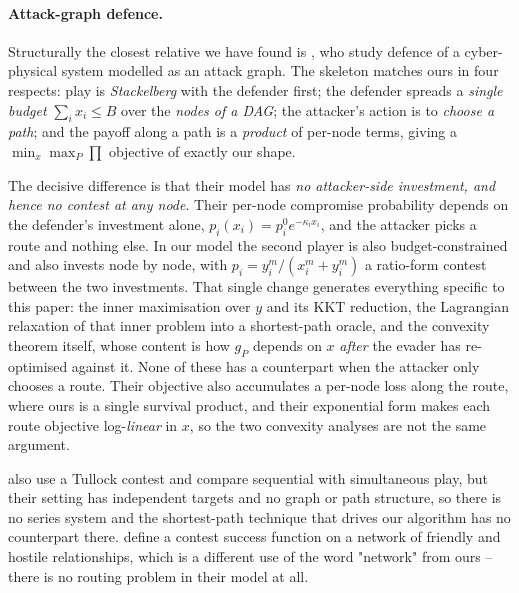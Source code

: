 \documentclass[11pt,a4paper]{article}
\theoremstyle{plain}
\theoremstyle{definition}
\begin{document}
\paragraph{Attack-graph defence.}
Structurally the closest relative we have found is \citet{oruganti2023},
who study defence of a cyber-physical system modelled as an attack graph.
The skeleton matches ours in four respects: play is \emph{Stackelberg}
with the defender first; the defender spreads a \emph{single budget}
$\sum_i x_i\le B$ over the \emph{nodes of a DAG}; the attacker's action is
to \emph{choose a path}; and the payoff along a path is a \emph{product}
of per-node terms, giving a $\min_x\max_P\prod$ objective of exactly our
shape.

The decisive difference is that their model has \emph{no attacker-side
investment, and hence no contest at any node}. Their per-node compromise
probability depends on the defender's investment alone,
$p_i(x_i)=p_i^{0}e^{-\kappa_i x_i}$, and the attacker picks a route and
nothing else. In our model the second player is also budget-constrained
and also invests node by node, with
$p_i=y_i^m/(x_i^m+y_i^m)$ a ratio-form contest between the two
investments. That single change generates everything specific to this
paper: the inner maximisation over $y$ and its KKT reduction, the
Lagrangian relaxation of that inner problem into a shortest-path oracle,
and the convexity theorem itself, whose content is how $g_P$ depends on
$x$ \emph{after} the evader has re-optimised against it. None of these has
a counterpart when the attacker only chooses a route. Their objective also
accumulates a per-node loss along the route, where ours is a single
survival product, and their exponential form makes each route objective
log-\emph{linear} in $x$, so the two convexity analyses are not the same
argument.

\citet{iliaev2023} also use a Tullock contest and compare sequential with
simultaneous play, but their setting has independent targets and no graph
or path structure, so there is no series system and the shortest-path
technique that drives our algorithm has no counterpart there.
\citet{bozbay2018} define a contest success function on a network of
friendly and hostile relationships, which is a different use of the word
"network" from ours -- there is no routing problem in their model at all.
\end{document}
